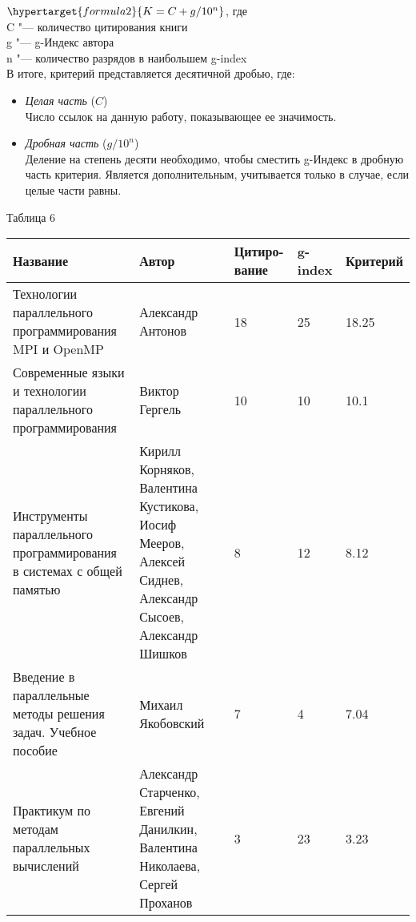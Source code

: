 \documentclass{article}
\begin{document}
			$ \hypertarget{formula2}{K = C + g / 10^n} $, где \\
			C  "---  количество цитирования книги \\
			g "--- g-Индекс автора\\
			n "--- количество разрядов в наибольшем g-index \\			
			В итоге, критерий представляется десятичной дробью, где: 
				\begin{itemize}
					\item \textit{Целая часть} ($C$)\\
						Число ссылок на данную работу, показывающее ее значимость.
					\item \textit{Дробная часть} ($g / 10^n$)\\
						Деление на степень десяти необходимо, чтобы сместить g-Индекс в дробную часть критерия. Является дополнительным, учитывается только в случае, если целые части равны.
				\end{itemize}
\newpage
			\begin{flushleft}
				Таблица 6
				\begin{longtable}{|p{6cm}|p{4cm}|p{1.8cm}|p{1.55cm}|p{2cm}|}
\hline
Название & Автор & Цитиро-вание & g-index & Критерий \\\hline

Технологии параллельного программирования MPI и OpenMP &
Александр Антонов & 18 & 25 & 18.25\\\hline 

Современные языки и технологии параллельного программирования &
Виктор Гергель & 10 & 10 & 10.1\\\hline

Инструменты параллельного программирования в системах с общей памятью &
Кирилл Корняков, Валентина Кустикова, Иосиф Мееров, Алексей Сиднев, Александр Сысоев, Александр Шишков & 8 & 12 & 8.12\\\hline

Введение в параллельные методы решения задач. Учебное пособие &
Михаил Якобовский & 7 & 4 & 7.04\\\hline

Практикум по методам параллельных вычислений &
Александр Старченко, Евгений Данилкин, Валентина Николаева, Сергей Проханов & 3 & 23 & 3.23\\\hline

				\end{longtable}
\newpage	
			\end{flushleft}
\newpage
\end{document}
